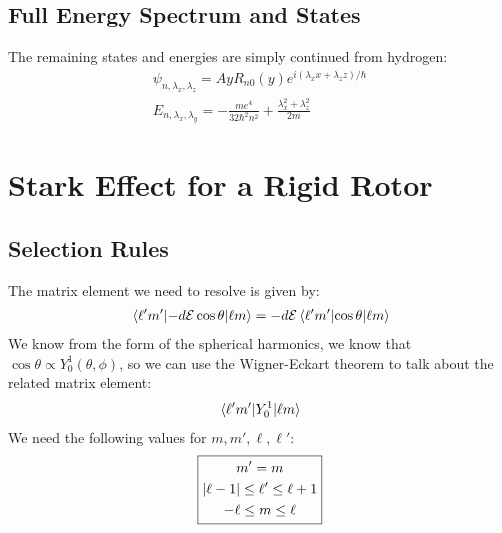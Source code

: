 \documentclass[12pt]{article}
\renewcommand{\l}{\ell}
\begin{document}
\subsection{Full Energy Spectrum and States}
The remaining states and energies are simply continued from hydrogen:
\begin{equation}
  \boxed{\begin{gathered}
      \psi_{n,\lambda_x,\lambda_z}=AyR_{n0}(y)e^{i(\lambda_xx+\lambda_zz)/\hbar}\\
      E_{n,\lambda_x,\lambda_y}=-\frac{me^4}{32\hbar^2n^2}+
      \frac{\lambda_x^2+\lambda_z^2}{2m}
  \end{gathered}}
\end{equation}

\section{Stark Effect for a Rigid Rotor}
\subsection{Selection Rules}
The matrix element we need to resolve is given by:
\begin{align*}
  \mel{\l'm'}{-d\mathcal{E}\cos\theta}{\l m}=
  -d\mathcal{E}\mel{\l'm'}{\cos\theta}{\l m}
\end{align*}
We know from the form of the spherical harmonics, we know that $\cos\theta\propto Y_0^1(\theta,\phi)$, so we can use the Wigner-Eckart theorem to talk about the related matrix element:
\begin{align*}
  \mel{\l'm'}{Y^1_0}{\l m}
\end{align*}
We need the following values for $m,m',\l,\l'$:
\begin{equation}
  \boxed{\begin{gathered}
      m'=m\\
      \abs{\l-1}\leq\l'\leq\l+1\\
      -\l\leq m\leq\l
  \end{gathered}}
\end{equation}
\end{document}
